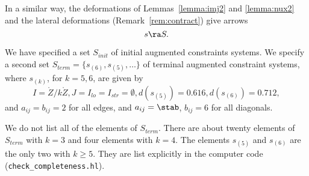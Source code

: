 In a similar way, the deformations of Lemmas~\ref{lemma:imj2} and \ref{lemma:nux2} and
the lateral deformations (Remark~\ref{rem:contract}) give arrows
\[
s\ra S.
\]

We have specified a set $S_{init}$ of initial augmented constraints systems.
We specify a second set $S_{term}=\{s_{(6)},s_{(5)},\ldots\}$ 
of terminal augmented constraint systems, where
 $s_{(k)}$, for $k=5,6$,  are given by
\[
I=\ring{Z}/k\ring{Z}, J=I_{lo}=I_{str}=\emptyset, d(s_{(5)})=0.616, d(s_{(6)})=0.712,
\]
and $a_{ij}=b_{ij}=2$ for all edges, 
and $a_{ij}=\stab$, $b_{ij}=6$ for all diagonals.

We do not list all of the elements of $S_{term}$.  There are about twenty
elements of $S_{term}$ with $k=3$ and four elements with $k=4$.  The elements
$s_{(5)}$ and $s_{(6)}$ are the only two with $k\ge 5$.
They are list explicitly
in the computer code (\verb!check_completeness.hl!).



